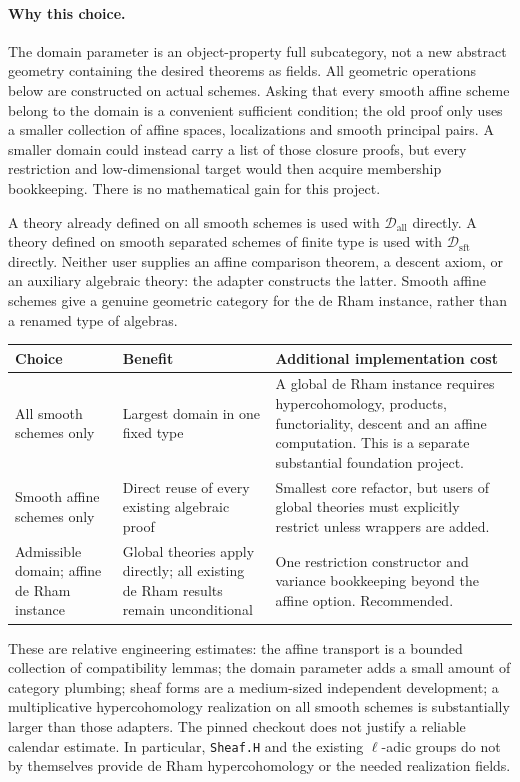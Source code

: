 \documentclass[11pt]{article}
\newcommand{\planned}[1]{\texttt{\detokenize{#1}}}
\theoremstyle{definition}
\theoremstyle{remark}
\newcommand{\Dom}{\mathcal D}
\renewcommand{\planned}[1]{\nolinkurl{#1}}
\begin{document}
\paragraph{Why this choice.}
The domain parameter is an object-property full subcategory, not a new abstract geometry containing the desired theorems as fields. All geometric operations below are constructed on actual schemes. Asking that every smooth affine scheme belong to the domain is a convenient sufficient condition; the old proof only uses a smaller collection of affine spaces, localizations and smooth principal pairs. A smaller domain could instead carry a list of those closure proofs, but every restriction and low-dimensional target would then acquire membership bookkeeping. There is no mathematical gain for this project.

A theory already defined on all smooth schemes is used with $\Dom_{\mathrm{all}}$ directly. A theory defined on smooth separated schemes of finite type is used with $\Dom_{\mathrm{sft}}$ directly. Neither user supplies an affine comparison theorem, a descent axiom, or an auxiliary algebraic theory: the adapter constructs the latter. Smooth affine schemes give a genuine geometric category for the de Rham instance, rather than a renamed type of algebras.

\begin{center}
\begin{tabular}{p{}p{}p{}}
\toprule Choice & Benefit & Additional implementation cost\\\midrule
All smooth schemes only & Largest domain in one fixed type & A global de Rham instance requires hypercohomology, products, functoriality, descent and an affine computation. This is a separate substantial foundation project.\\
Smooth affine schemes only & Direct reuse of every existing algebraic proof & Smallest core refactor, but users of global theories must explicitly restrict unless wrappers are added.\\
Admissible domain; affine de Rham instance & Global theories apply directly; all existing de Rham results remain unconditional & One restriction constructor and variance bookkeeping beyond the affine option. Recommended.\\
\bottomrule
\end{tabular}
\end{center}

These are relative engineering estimates: the affine transport is a bounded collection of compatibility lemmas; the domain parameter adds a small amount of category plumbing; sheaf forms are a medium-sized independent development; a multiplicative hypercohomology realization on all smooth schemes is substantially larger than those adapters. The pinned checkout does not justify a reliable calendar estimate. In particular, \planned{Sheaf.H} and the existing $\ell$-adic groups do not by themselves provide de Rham hypercohomology or the needed realization fields.
\end{document}
